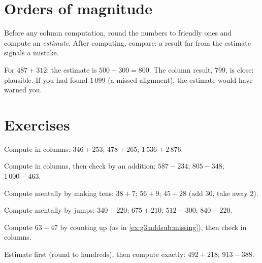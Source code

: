 \section{Orders of magnitude}

\begin{method}\label{met:g3:addsub:estimate}
Before any column computation, round the numbers to friendly ones and
compute an \emph{estimate}. After computing, compare: a result far
from the estimate signals a mistake.
\end{method}

\begin{example}
For $487 + 312$: the estimate is $500 + 300 = 800$. The column
result, $799$, is close: plausible. If you had found $1\,099$
(a missed alignment), the estimate would have warned you.
\end{example}

\section{Exercises}

\begin{exercise}[$\star$]\label{exo:g3:addsub:1}
Compute in columns: $346 + 253$; \quad $478 + 265$; \quad
$1\,536 + 2\,876$.
\end{exercise}

\begin{exercise}[$\star$]\label{exo:g3:addsub:2}
Compute in columns, then check by an addition: $587 - 234$; \quad
$805 - 348$; \quad $1\,000 - 463$.
\end{exercise}

\begin{exercise}[$\star$]\label{exo:g3:addsub:3}
Compute mentally by making tens: $38 + 7$; \quad $56 + 9$; \quad
$45 + 28$ (add $30$, take away $2$).
\end{exercise}

\begin{exercise}[$\star$]\label{exo:g3:addsub:4}
Compute mentally by jumps: $340 + 220$; \quad $675 + 210$; \quad
$512 - 300$; \quad $840 - 220$.
\end{exercise}

\begin{exercise}[$\star$]\label{exo:g3:addsub:5}
Compute $63 - 47$ by counting up (as in
\cref{ex:g3:addsub:missing}), then check in columns.
\end{exercise}

\begin{exercise}[$\star$]\label{exo:g3:addsub:6}
Estimate first (round to hundreds), then compute exactly:
$492 + 218$; \quad $913 - 388$.
\end{exercise}

